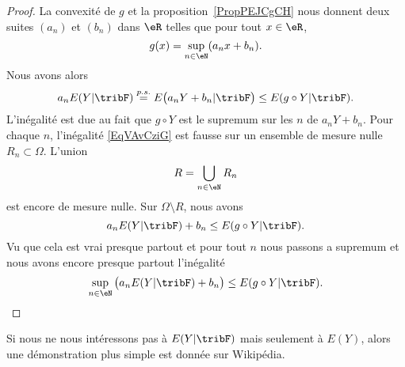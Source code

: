 \begin{proof}
    La convexité de \( g\) et la proposition~\ref{PropPEJCgCH} nous donnent deux suites \( (a_n)\) et \( (b_n)\) dans \( \eR\) telles que pour tout \( x\in \eR\),
    \begin{equation}
        g(x)=\sup_{n\in \eN}(a_nx+b_n).
    \end{equation}
    Nous avons alors
    \begin{equation}    \label{EqVAvCziG}
        a_nE(Y|\tribF)\stackrel{p.s.}{=}E\big( a_nY+b_n|\tribF \big)\leq  E(g\circ Y|\tribF).
    \end{equation}
    L'inégalité est due au fait que \( g\circ Y\) est le supremum sur les \( n\) de \( a_nY+b_n\). Pour chaque \( n\), l'inégalité \eqref{EqVAvCziG} est fausse sur un ensemble de mesure nulle \( R_n\subset\Omega\). L'union
    \begin{equation}
        R=\bigcup_{n\in \eN}R_n
    \end{equation}
    est encore de mesure nulle. Sur \( \Omega\setminus R\), nous avons
    \begin{equation}
        a_nE(Y|\tribF)+b_n\leq E(g\circ Y|\tribF).
    \end{equation}
    Vu que cela est vrai presque partout et pour tout \( n\) nous passons a supremum et nous avons encore presque partout l'inégalité
    \begin{equation}
        \sup_{n\in\eN}\big( a_nE(Y|\tribF)+b_n \big)\leq E(g\circ Y|\tribF).
    \end{equation}
\end{proof}

Si nous ne nous intéressons pas à \( E(Y|\tribF)\) mais seulement à \( E(Y)\), alors une démonstration plus simple est donnée sur Wikipédia\cite{YMmJevi}.
